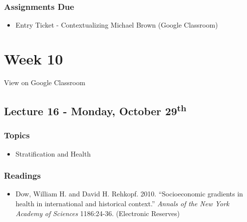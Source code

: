 \documentclass[]{book}
\providecommand{\tightlist}{%
  \setlength{\itemsep}{0pt}\setlength{\parskip}{0pt}}
\theoremstyle{definition}
\theoremstyle{definition}
\theoremstyle{definition}
\theoremstyle{remark}
\begin{document}
\hypertarget{assignments-due-3}{%
\subsubsection*{Assignments Due}\label{assignments-due-3}}

\begin{itemize}
\tightlist
\item
  Entry Ticket - Contextualizing Michael Brown (Google Classroom)
\end{itemize}

\hypertarget{week-10}{%
\section*{Week 10}\label{week-10}}

View on Google Classroom

\hypertarget{lecture-16---monday-october-29th}{%
\subsection*{\texorpdfstring{Lecture 16 - Monday, October
29\textsuperscript{th}}{Lecture 16 - Monday, October 29th}}\label{lecture-16---monday-october-29th}}

\hypertarget{topics-18}{%
\subsubsection*{Topics}\label{topics-18}}

\begin{itemize}
\tightlist
\item
  Stratification and Health
\end{itemize}

\hypertarget{readings-17}{%
\subsubsection*{Readings}\label{readings-17}}

\begin{itemize}
\tightlist
\item
  Dow, William H. and David H. Rehkopf. 2010. ``Socioeconomic gradients
  in health in international and historical context.'' \emph{Annals of
  the New York Academy of Sciences} 1186:24-36. (Electronic Reserves)
\end{itemize}
\end{document}
